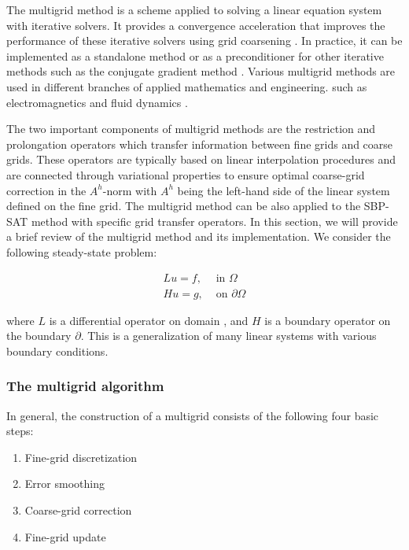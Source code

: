 
The multigrid method is a scheme applied to solving a linear equation system with iterative solvers. It provides a convergence acceleration that improves the performance of these iterative solvers using grid coarsening \citep{fedorenko1973iterative} \citep{trottenberg2000multigrid}. In practice, it can be implemented as a standalone method or as a preconditioner for other iterative methods such as the conjugate gradient method \citep{tatebe1993multigrid}. Various multigrid methods are used in different branches of applied mathematics and engineering. such as electromagnetics \citep{stolk2014multigrid} and fluid dynamics \citep{adler2016monolithic}.  

The two important components of multigrid methods are the restriction and prolongation operators which transfer information between fine grids and coarse grids. These operators are typically based on linear interpolation procedures and are connected through variational properties \citep{10.5555/357695} to ensure optimal coarse-grid correction in the $A^h$-norm with $A^h$ being the left-hand side of the linear system defined on the fine grid. The multigrid method can be also applied to the SBP-SAT method with specific grid transfer operators. In this section, we will provide a brief review of the multigrid method and its implementation. We consider the following steady-state problem:

\begin{align}
    Lu = f, &\text{ in }  \text{$\Omega$}  \label{stead-state-problem}\\
    Hu = g, &\text{ on } \partial\text{$\Omega$}
    \label{stead-state-problem2}
\end{align}

where $L$ is a differential operator on domain \text{$\Omega$},  and $H$ is a boundary operator on the boundary $\partial$\text{$\Omega$}. This is a generalization of many linear systems with various boundary conditions. 

\subsubsection{The multigrid algorithm}
In general, the construction of a multigrid consists of the following four basic steps:

\begin{enumerate}
    \item Fine-grid discretization
    \item Error smoothing
    \item Coarse-grid correction
    \item Fine-grid update
\end{enumerate}

